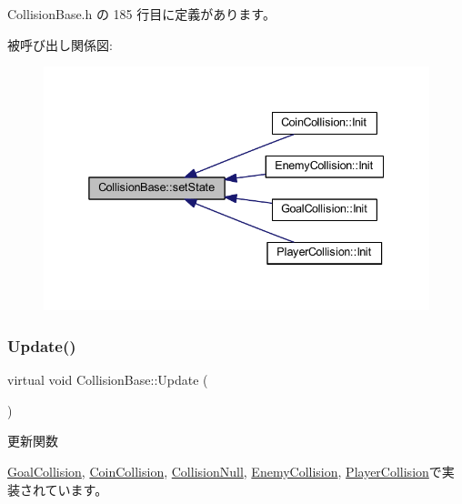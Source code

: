  Collision\+Base.\+h の 185 行目に定義があります。

被呼び出し関係図\+:\nopagebreak
\begin{figure}[H]
\begin{center}
\leavevmode
\includegraphics[width=338pt]{class_collision_base_a01db1e666b8e71c33969e9ab6bbc724e_icgraph}
\end{center}
\end{figure}
\mbox{\label{class_collision_base_a0f967cf5de4178ee99f434c3ff4f16fd}} 
\subsubsection{\texorpdfstring{Update()}{Update()}}
{\footnotesize\ttfamily virtual void Collision\+Base\+::\+Update (\begin{DoxyParamCaption}{ }\end{DoxyParamCaption})\hspace{0.3cm}{\ttfamily [pure virtual]}}



更新関数 



\mbox{\hyperlink{class_goal_collision_a1e3995dc2f5ba2678580d06699ca6936}{Goal\+Collision}}, \mbox{\hyperlink{class_coin_collision_a981fd9b1b8c688a757a456a56d80501b}{Coin\+Collision}}, \mbox{\hyperlink{class_collision_null_a5e5e094e3fbe3ccc0515e485c739bd15}{Collision\+Null}}, \mbox{\hyperlink{class_enemy_collision_ab54133504d867c6d2070d2f3854a0aaf}{Enemy\+Collision}}, \mbox{\hyperlink{class_player_collision_a09f97f220903f5724a3af6b97af3a336}{Player\+Collision}}で実装されています。


